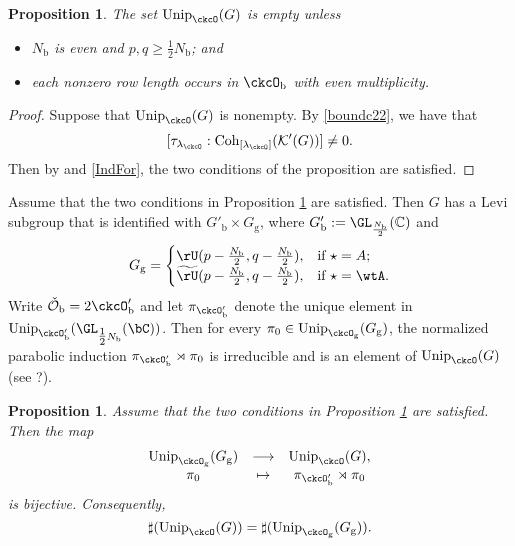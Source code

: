 \documentclass[12pt,a4paper]{amsart}
\newcommand{\CK}{{\mathcal {K}}}
\newcommand{\CO}{{\mathcal {O}}}
\newcommand{\oU}{\operatorname{U}}
\newcommand{\be}{\begin {equation}}
\newcommand{\ee}{\end {equation}}
\numberwithin{equation}{section}
\newtheorem{prop}[thm]{Proposition}
\theoremstyle{remark}
\def\half{{\tfrac{1}{2}}}
\def\Unip{\mathrm{Unip}}
\def\lamck{\lambda_\ckcO}
\def\Cint#1{\Coh_{[#1]}}
\def\LC{{}^{\scriptscriptstyle L}\sC}
\def\tU{\widetilde{\rU}}
\def\Coh{\mathrm{Coh}}
\def\ckcOb{\ckcO_{\mathrm b}}
\def\ckcOpb{\ckcO'_{\mathrm b}}
\def\Gg{G_{\mathrm g}}
\begin{document}


\begin{prop} \label{propu0}
The set $\Unip_{\ckcO}(G)$ is empty  unless           \begin{itemize}
            \item $N_{\mathrm b}$ is even and $p,q \geq \half N_{\mathrm b}$; and
            \item each nonzero row length occurs in $\ckcOb$ with even multiplicity.
          \end{itemize}
\end{prop}

\begin{proof} 
  Suppose that  $\Unip_{\ckcO}(G)$ is nonempty. By \eqref{boundc22}, we have that
  \[
  [\tau_{\lamck}:\Cint{\lamck}(\CK'(G))]\ne 0.
  \]
  Then  by  and \eqref{IndFor}, the two conditions of the proposition are satisfied.  
  \end{proof}

Assume that the two conditions in Proposition \ref{propu0} are satisfied. Then $G$ has a Levi subgroup that is identified with $G'_{\mathrm b}\times G_{\mathrm g}$, where 
$G'_{\mathrm b}:=\GL_{\frac{N_{\mathrm b}}{2}}(\C)$ and 
\[
  G_{\mathrm g} =
  \begin{cases}
    \rU(p-\frac{N_{\mathrm b}}{2},q-\frac{N_{\mathrm b}}{2}),  & \text{if }\star = A;\\
    \tU(p-\frac{N_{\mathrm b}}{2},q-\frac{N_{\mathrm b}}{2}),  & \text{if }\star = \wtA.
\end{cases}
\]
Write $\check \CO_{\mathrm b}=2 \ckcOpb$ and let $\pi_{\ckcOpb}$ denote the unique element in
          $\Unip_{\ckcOpb}(\GL_{\half N_{\mathrm b}}(\bC))$. Then for every $\pi_0\in  \Unip_{\ckcO_{\mathrm g}}(\Gg)$, the  normalized parabolic induction  $\pi_{\ckcOpb}\rtimes \pi_{0}$ is irreducible and is an element of $\Unip_{\ckcO}(G)$ (see ?). 

\begin{prop} 
Assume that the two conditions in Proposition \ref{propu0} are satisfied. Then
                  the map 
          \[
          \begin{array}{ccc}
         \Unip_{\ckcO_{\mathrm g}}(\Gg)&\longrightarrow &\Unip_{\ckcO}(G),\\
            \pi_{0}& \mapsto & \pi_{\ckcOpb}\rtimes \pi_{0} \\
          \end{array}
          \]
          is bijective. 
          Consequently, 
           \be\label{unitarred1}
          \sharp(\Unip_{\ckcO}(G)) = \sharp(\Unip_{\ckcO_{\mathrm g}}(\Gg)).
          \ee
\end{prop}
\end{document}
